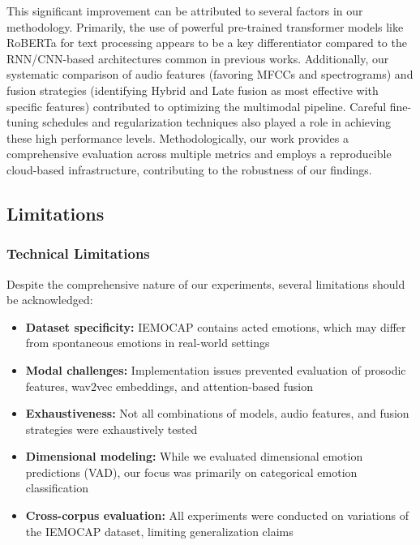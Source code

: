 \documentclass[12pt]{article}
\begin{document}
This significant improvement can be attributed to several factors in our methodology. Primarily, the use of powerful pre-trained transformer models like RoBERTa for text processing appears to be a key differentiator compared to the RNN/CNN-based architectures common in previous works. Additionally, our systematic comparison of audio features (favoring MFCCs and spectrograms) and fusion strategies (identifying Hybrid and Late fusion as most effective with specific features) contributed to optimizing the multimodal pipeline. Careful fine-tuning schedules and regularization techniques also played a role in achieving these high performance levels. Methodologically, our work provides a comprehensive evaluation across multiple metrics and employs a reproducible cloud-based infrastructure, contributing to the robustness of our findings.

\subsection{Limitations}
\subsubsection{Technical Limitations}
Despite the comprehensive nature of our experiments, several limitations should be acknowledged:

\begin{itemize}
    \item \textbf{Dataset specificity:} IEMOCAP contains acted emotions, which may differ from spontaneous emotions in real-world settings

    \item \textbf{Modal challenges:} Implementation issues prevented evaluation of prosodic features, wav2vec embeddings, and attention-based fusion

    \item \textbf{Exhaustiveness:} Not all combinations of models, audio features, and fusion strategies were exhaustively tested

    \item \textbf{Dimensional modeling:} While we evaluated dimensional emotion predictions (VAD), our focus was primarily on categorical emotion classification

    \item \textbf{Cross-corpus evaluation:} All experiments were conducted on variations of the IEMOCAP dataset, limiting generalization claims
\end{itemize}
\end{document}
